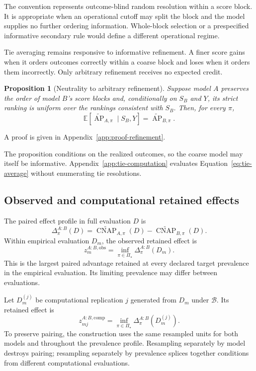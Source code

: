 \documentclass[11pt]{article}
\newcommand{\AP}{\operatorname{AP}}
\newcommand{\CNAP}{\operatorname{CNAP}}
\newcommand{\PSet}{\Pi_\star}
\newcommand{\Boot}{\mathcal{B}}
\newcommand{\E}{\mathbb{E}}
\newcommand{\APta}{\widetilde{\AP}}
\newcommand{\CNAPta}{\widetilde{\CNAP}}
\newtheorem{proposition}{Proposition}
\theoremstyle{remark}
\begin{document}
The convention represents outcome-blind random resolution within a score
block. It is appropriate when an operational cutoff may split the block and
the model supplies no further ordering information. Whole-block selection or
a prespecified informative secondary rule would define a different operational
regime.

Tie averaging remains responsive to informative refinement. A finer score
gains when it orders outcomes correctly within a coarse block and loses when it
orders them incorrectly. Only arbitrary refinement receives no expected
credit.

\begin{proposition}[Neutrality to arbitrary refinement]
\label{prop:refinement}
Suppose model $A$ preserves the order of model $B$'s score blocks and,
conditionally on $S_B$ and $Y$, its strict ranking is uniform over the rankings
consistent with $S_B$. Then, for every $\pi$,
\[
\E[\APta_{A,\pi}\mid S_B,Y]=\APta_{B,\pi}.
\]
\end{proposition}

A proof is given in Appendix~\ref{app:proof-refinement}.

The proposition conditions on the realized outcomes, so the coarse model may
itself be informative. Appendix~\ref{app:tie-computation} evaluates
Equation~\eqref{eq:tie-average} without enumerating tie resolutions.

\subsection{Observed and computational retained effects}

The paired effect profile in full evaluation $D$ is
\begin{equation}
\Delta^{A:B}_\pi(D)
=
\CNAPta_{A,\pi}(D)-\CNAPta_{B,\pi}(D).
\label{eq:paired-profile}
\end{equation}
Within empirical evaluation $D_m$, the observed retained effect is
\begin{equation}
z_m^{A:B,\mathrm{obs}}
=
\inf_{\pi\in\PSet}\Delta^{A:B}_\pi(D_m).
\label{eq:observed-retained}
\end{equation}
This is the largest paired advantage retained at every declared target
prevalence in the empirical evaluation. Its limiting prevalence may differ
between evaluations.

Let $D_m^{(j)}$ be computational replication $j$ generated from $D_m$ under
$\Boot$. Its retained effect is
\begin{equation}
z_{mj}^{A:B,\mathrm{comp}}
=
\inf_{\pi\in\PSet}\Delta^{A:B}_\pi(D_m^{(j)}).
\label{eq:computational-retained}
\end{equation}
To preserve pairing, the construction uses the same resampled units for both
models and throughout the prevalence profile. Resampling separately by model
destroys pairing; resampling separately by prevalence splices together
conditions from different computational evaluations.
\end{document}
